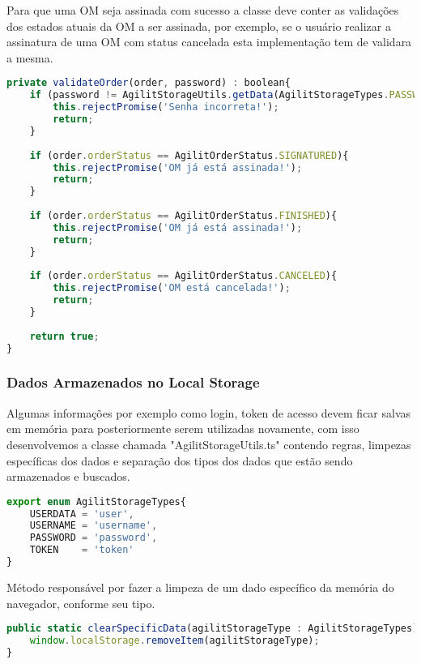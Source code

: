 Para que uma OM seja assinada com sucesso a classe deve conter as validações dos estados atuais da OM a ser
assinada, por exemplo, se o usuário realizar a assinatura de uma OM com status cancelada esta implementação tem
de validara a mesma.

\begin{lstlisting}[language=JavaScript, caption={Validar estados da OM}]
private validateOrder(order, password) : boolean{
	if (password != AgilitStorageUtils.getData(AgilitStorageTypes.PASSWORD)){
		this.rejectPromise('Senha incorreta!');
		return;
	}
	
	if (order.orderStatus == AgilitOrderStatus.SIGNATURED){
		this.rejectPromise('OM já está assinada!');
		return;
	}
	
	if (order.orderStatus == AgilitOrderStatus.FINISHED){
		this.rejectPromise('OM já está assinada!');
		return;
	}
	
	if (order.orderStatus == AgilitOrderStatus.CANCELED){      
		this.rejectPromise('OM está cancelada!');
		return;
	}
	
	return true;
}
\end{lstlisting}

\subsubsection{Dados Armazenados no Local Storage}
Algumas informações por exemplo como login, token de acesso devem ficar salvas em memória para posteriormente serem utilizadas novamente, com isso desenvolvemos a classe chamada "AgilitStorageUtils.ts" contendo regras, limpezas específicas dos dados e separação dos tipos dos dados que estão sendo armazenados e buscados.

\begin{lstlisting}[language=JavaScript, caption={Tipos de dados armazenados}]
export enum AgilitStorageTypes{
	USERDATA = 'user',
	USERNAME = 'username',
	PASSWORD = 'password',
	TOKEN    = 'token'
}
\end{lstlisting}

Método responsável por fazer a limpeza de um dado específico da memória do navegador, conforme seu tipo.

\begin{lstlisting}[language=JavaScript, caption={Limpeza específico de cada dado}]
public static clearSpecificData(agilitStorageType : AgilitStorageTypes){
	window.localStorage.removeItem(agilitStorageType);
}
\end{lstlisting}

